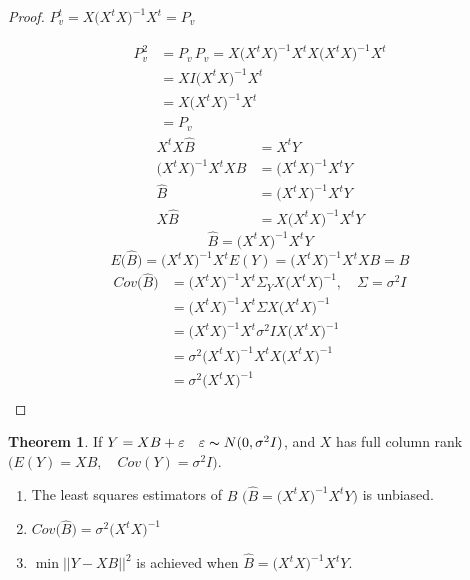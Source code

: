 \documentclass[11pt,a4paper]{article}
\theoremstyle{definition}
\newtheorem{thm}{Theorem}[subsection]
\begin{document}
\begin{proof}

$P_v^t  = X\big(X^tX\big)^{-1}X^t=P_v$

\begin{align*}
P_v^2 & = P_v\, P_v = X\big(X^tX\big)^{-1}X^tX\big(X^tX\big)^{-1}X^t\\
      & = XI\big(X^tX\big)^{-1}X^t\\
      & = X\big(X^tX\big)^{-1}X^t\\
      & = P_v
\end{align*}
\begin{align*}
X^tX\widehat{B} & = X^tY\\
\big(X^tX\big)^{-1}X^tX\widehat{B} & = \big(X^tX\big)^{-1}X^tY\\
\widehat{B} & = \big(X^tX\big)^{-1}X^tY\\
X\widehat{B} & = X\big(X^tX\big)^{-1}X^tY
\end{align*}
$$\widehat{B} =\big(X^tX\big)^{-1}X^tY$$
$$E\big(\widehat{B}\big)=\big(X^tX\big)^{-1}X^tE(Y)=\big(X^tX\big)^{-1}X^tXB=B$$
\begin{align*}
Cov\big(\widehat{B}\big) & = \big(X^tX\big)^{-1}X^t\Sigma_YX\big(X^tX\big)^{-1},\quad  \Sigma = \sigma^2I\\
                     & = \big(X^tX\big)^{-1}X^t\Sigma X\big(X^tX\big)^{-1}\\
                     & = \big(X^tX\big)^{-1}X^t\sigma^2IX\big(X^tX\big)^{-1}\\
                     & = \sigma^2\big(X^tX\big)^{-1}X^tX\big(X^tX\big)^{-1}\\
                     & = \sigma^2\big(X^tX\big)^{-1}\\
\end{align*}
\end{proof}


\begin{thm}\label{res:thm:2.3.3}
If $Y=XB+\varepsilon\quad  \varepsilon \thicksim N(0,\sigma^2I)$, and $X$ has full column rank $\big(E(Y)=XB,\quad  Cov(Y)=\sigma^2I\big).$
\begin{enumerate}
\item[i.] The least squares estimators of $B$ $\Big(\widehat{B}=\big(X^tX\big)^{-1}X^tY\Big)$ is unbiased.
\item[ii.] $Cov\big(\widehat{B}\big)=\sigma^2\big(X^tX\big)^{-1}$
\item[iii.] $\min||Y-XB||^2$ is achieved when $\widehat{B}=\big(X^tX\big)^{-1}X^tY.$\\
\end{enumerate}
\end{thm}
\end{document}
